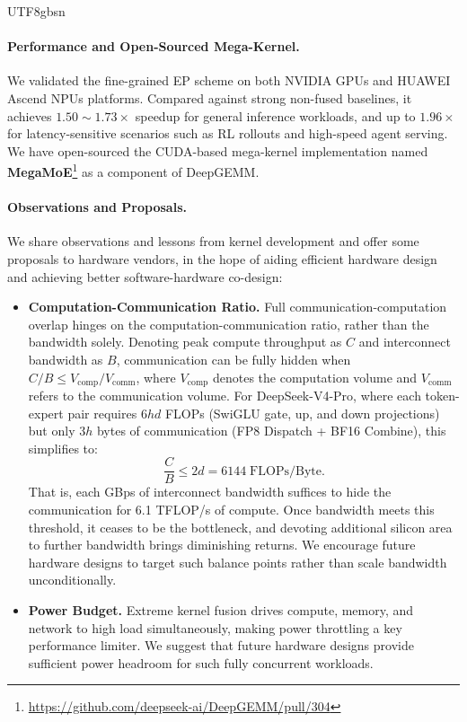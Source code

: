 \documentclass[11pt, a4paper, logo, copyright, nonumbering]{deepseek}
\newcommand{\dsvivp}{DeepSeek-V4-Pro}
\begin{document}
\begin{CJK*}{UTF8}{gbsn}
\paragraph{Performance and Open-Sourced Mega-Kernel.}
We validated the fine-grained EP scheme on both NVIDIA GPUs and HUAWEI Ascend NPUs platforms. 
Compared against strong non-fused baselines, it achieves $1.50\sim1.73\times$ speedup for general inference workloads, and up to $1.96\times$ for latency-sensitive scenarios such as RL rollouts and high-speed agent serving. 
We have open-sourced the CUDA-based mega-kernel implementation named  \textbf{MegaMoE}\footnote{\url{https://github.com/deepseek-ai/DeepGEMM/pull/304}} as a component of DeepGEMM.

\paragraph{Observations and Proposals.}
We share observations and lessons from kernel development and offer some proposals to hardware vendors, in the hope of aiding efficient hardware design and achieving better software-hardware co-design:

\begin{itemize}[topsep=0pt]
    \item \textbf{Computation-Communication Ratio.}
    Full communication-computation overlap hinges on the computation-communication ratio, rather than the bandwidth solely.
    Denoting peak compute throughput as $C$ and interconnect bandwidth as $B$, communication can be fully hidden when $C/B \leq V_{\text{comp}} / V_{\text{comm}}$, where $V_{\text{comp}}$ denotes the computation volume and $V_{\text{comm}}$ refers to the communication volume.
    For \dsvivp{}, where each token-expert pair requires $6hd$ FLOPs (SwiGLU gate, up, and down projections) but only $3h$ bytes of communication (FP8 Dispatch + BF16 Combine), this simplifies to:
    $$\frac{C}{B} \leq 2d = 6144 \; \mathrm{FLOPs/Byte}.$$
    That is, each GBps of interconnect bandwidth suffices to hide the communication for 6.1 TFLOP/s of compute.
    Once bandwidth meets this threshold, it ceases to be the bottleneck, and devoting additional silicon area to further bandwidth brings diminishing returns.
    We encourage future hardware designs to target such balance points rather than scale bandwidth unconditionally.

    \item \textbf{Power Budget.}
    Extreme kernel fusion drives compute, memory, and network to high load simultaneously, making power throttling a key performance limiter. 
    We suggest that future hardware designs provide sufficient power headroom for such fully concurrent workloads.


\end{itemize}
\end{CJK*}
\end{document}
